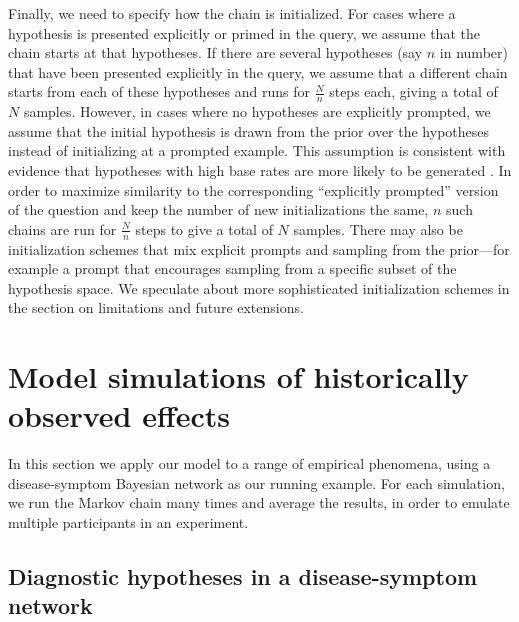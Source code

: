 Finally, we need to specify how the chain is initialized. For cases where a hypothesis is presented explicitly or primed in the query, we assume that the chain starts at that hypotheses.
If there are several hypotheses (say $n$ in number) that have been presented explicitly in the query, we assume
that a different chain starts from each of these hypotheses and runs for $\frac{N}{n}$ steps each, giving a total of $N$ samples. However, in cases where no hypotheses are explicitly prompted, we assume that the initial hypothesis is drawn from the prior over the hypotheses instead of initializing at a prompted example. This assumption is consistent with evidence that hypotheses with high base rates are more likely to be generated \citep{weber1993}. In order to maximize similarity to the corresponding ``explicitly prompted'' version of the question and keep the number of new initializations the same, $n$ such chains are run for $\frac{N}{n}$ steps to give a total of $N$ samples.
There may also be initialization schemes that mix explicit prompts and sampling from the prior---for example a prompt that encourages sampling from a specific subset of the hypothesis space. We speculate about more sophisticated initialization schemes in the section on limitations and future extensions.


\section{Model simulations of historically observed effects}

In this section we apply our model to a range of empirical phenomena, using a disease-symptom Bayesian network as our running example. For each simulation, we run the Markov chain many times and average the results, in order to emulate multiple participants in an experiment.

\subsection{Diagnostic hypotheses in a disease-symptom network}

